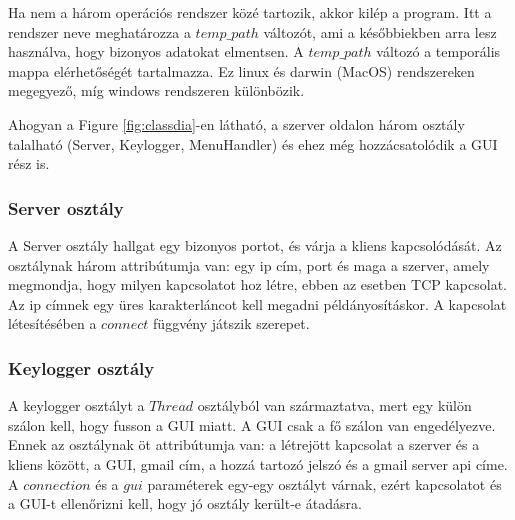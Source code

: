 \documentclass[a4paper, 11pt]{article}
\begin{document}


\noindent Ha nem a három operációs rendszer közé tartozik, akkor kilép a program. Itt a rendszer neve meghatározza a $temp\_path$ változót, ami a későbbiekben arra lesz használva, hogy bizonyos adatokat elmentsen. A $temp\_path$ változó a temporális mappa elérhetőségét tartalmazza. Ez linux és darwin (MacOS) rendszereken megegyező, míg windows rendszeren különbözik.

Ahogyan a Figure \ref{fig:classdia}-en látható, a szerver oldalon három osztály talalható (Server, Keylogger, MenuHandler) és ehez még hozzácsatolódik a GUI rész is.

\subsubsection{Server osztály}\label{subsubsec:serverclass}
A Server osztály hallgat egy bizonyos portot, és várja a kliens kapcsolódását. Az osztálynak három attribútumja van: egy ip cím, port és maga a szerver, amely megmondja, hogy milyen kapcsolatot hoz létre, ebben az esetben TCP kapcsolat. Az ip címnek egy üres karakterláncot kell megadni példányosításkor. A kapcsolat létesítésében a $connect$ függvény játszik szerepet.

\subsubsection{Keylogger osztály}\label{subsubsec:keyloggerclass}
A keylogger osztályt a $Thread$ osztályból van származtatva, mert egy külön szálon kell, hogy fusson a GUI miatt. A GUI csak a fő szálon van engedélyezve. Ennek az osztálynak öt attribútumja van: a létrejött kapcsolat a szerver és a kliens között, a GUI, gmail cím, a hozzá tartozó jelszó és a gmail server api címe. A $connection$ és a $gui$ paraméterek egy-egy osztályt várnak, ezért kapcsolatot és a GUI-t ellenőrizni kell, hogy jó osztály került-e átadásra.

\end{document}
